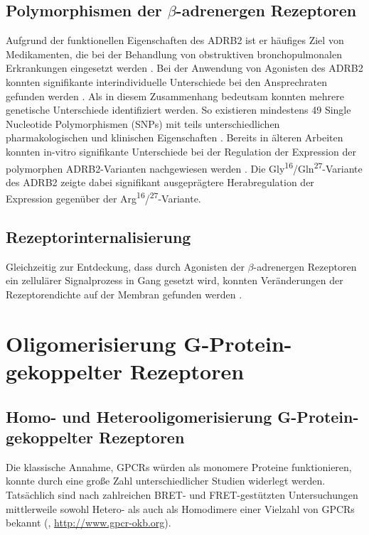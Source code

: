 \subsection{Polymorphismen der $\beta$-adrenergen Rezeptoren}
\label{polymorphisms}
Aufgrund der funktionellen Eigenschaften des ADRB2 ist er häufiges Ziel von Medikamenten, die bei der Behandlung von obstruktiven bronchopulmonalen Erkrankungen eingesetzt werden \parencite{Ortega2007}. Bei der Anwendung von Agonisten des ADRB2 konnten signifikante interindividuelle Unterschiede bei den Ansprechraten gefunden werden \parencite{Hawkins2006}. Als in diesem Zusammenhang bedeutsam konnten mehrere genetische Unterschiede identifiziert werden. So existieren mindestens 49 Single Nucleotide Polymorphismen (SNPs) mit teils unterschiedlichen pharmakologischen und klinischen Eigenschaften \parencite{Chung2011}. %
Bereits in älteren Arbeiten konnten in-vitro signifikante Unterschiede bei der Regulation der Expression der polymorphen ADRB2-Varianten nachgewiesen werden \parencite{Green1994}. Die Gly\textsuperscript{16}/Gln\textsuperscript{27}-Variante des ADRB2 zeigte dabei signifikant ausgeprägtere Herabregulation der Expression gegenüber der Arg\textsuperscript{16}/\textsuperscript{27}-Variante. 

\subsection{Rezeptorinternalisierung}
\label{internalization}
Gleichzeitig zur Entdeckung, dass durch Agonisten der $\beta$-adrenergen Rezeptoren ein zellulärer  Signalprozess in Gang gesetzt wird, konnten Veränderungen der Rezeptorendichte auf der Membran gefunden werden \parencite{Chuang1979}. 

\section{Oligomerisierung G-Protein-gekoppelter Rezeptoren}
\subsection{Homo- und Heterooligomerisierung G-Protein-gekoppelter Rezeptoren}
Die klassische Annahme, GPCRs würden als monomere Proteine funktionieren, konnte durch eine große Zahl unterschiedlicher Studien widerlegt werden. Tatsächlich sind nach zahlreichen BRET- und FRET-gestützten Untersuchungen mittlerweile sowohl Hetero- als auch als Homodimere einer Vielzahl von GPCRs bekannt (\cite{Khelashvili2010}, \url{http://www.gpcr-okb.org}).

